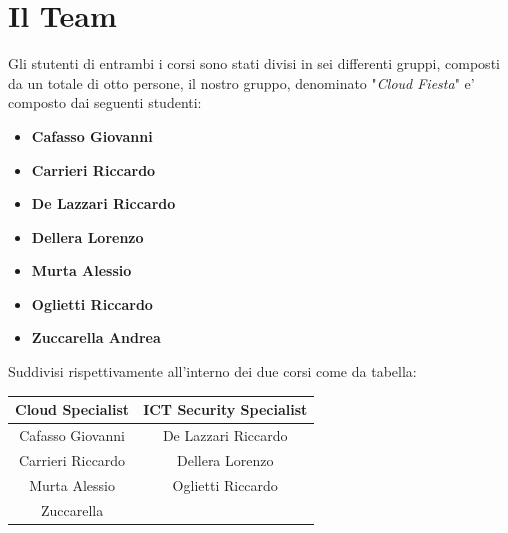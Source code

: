 \documentclass[a4paper]{report}
\begin{document}
	\section{Il Team}
	Gli stutenti di entrambi i corsi sono stati divisi in sei differenti gruppi, composti da un totale di otto persone,
	il nostro gruppo, denominato "\emph{Cloud Fiesta}" e' composto dai seguenti studenti:
	\begin{itemize}
		\item \textbf{Cafasso Giovanni}
		\item \textbf{Carrieri Riccardo}
		\item \textbf{De Lazzari Riccardo}
		\item \textbf{Dellera Lorenzo}
		\item \textbf{Murta Alessio}
		\item \textbf{Oglietti Riccardo}
		\item \textbf{Zuccarella Andrea}
	\end{itemize}
	Suddivisi rispettivamente all'interno dei due corsi come da tabella:
	\begin{center}
		\begin{tabular}{c|c}
			Cloud Specialist & ICT Security Specialist \\
			\hline
			Cafasso Giovanni & De Lazzari Riccardo \\
			Carrieri Riccardo & Dellera Lorenzo \\
			Murta Alessio & Oglietti Riccardo \\
			Zuccarella & \\
		\end{tabular}
	\end{center}
\end{document}
